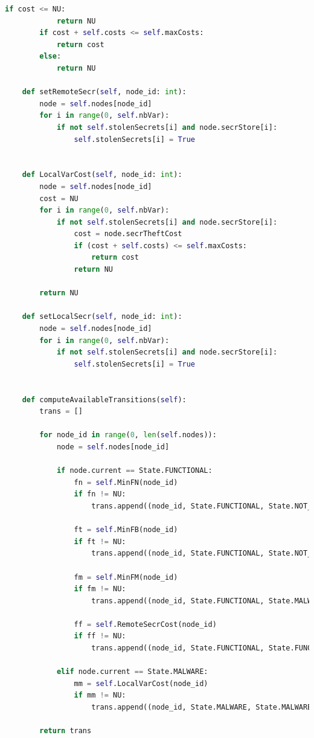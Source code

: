 \documentclass[a4paper]{article}
\begin{document}
\begin{appendices}
\begin{lstlisting}[language=python]
        if cost <= NU:
            return NU
        if cost + self.costs <= self.maxCosts:
            return cost
        else:
            return NU
        
    def setRemoteSecr(self, node_id: int):
        node = self.nodes[node_id]
        for i in range(0, self.nbVar):
            if not self.stolenSecrets[i] and node.secrStore[i]:
                self.stolenSecrets[i] = True


    def LocalVarCost(self, node_id: int):
        node = self.nodes[node_id]
        cost = NU
        for i in range(0, self.nbVar):
            if not self.stolenSecrets[i] and node.secrStore[i]:
                cost = node.secrTheftCost
                if (cost + self.costs) <= self.maxCosts:
                    return cost
                return NU

        return NU

    def setLocalSecr(self, node_id: int):
        node = self.nodes[node_id]
        for i in range(0, self.nbVar):
            if not self.stolenSecrets[i] and node.secrStore[i]:
                self.stolenSecrets[i] = True


    def computeAvailableTransitions(self):
        trans = []

        for node_id in range(0, len(self.nodes)):
            node = self.nodes[node_id]

            if node.current == State.FUNCTIONAL:
                fn = self.MinFN(node_id)
                if fn != NU:
                    trans.append((node_id, State.FUNCTIONAL, State.NOT_AVAILABLE, fn, None))

                ft = self.MinFB(node_id)
                if ft != NU:
                    trans.append((node_id, State.FUNCTIONAL, State.NOT_AVAILABLE, ft, None))

                fm = self.MinFM(node_id)
                if fm != NU:
                    trans.append((node_id, State.FUNCTIONAL, State.MALWARE, fm, None))

                ff = self.RemoteSecrCost(node_id)
                if ff != NU:
                    trans.append((node_id, State.FUNCTIONAL, State.FUNCTIONAL, ff, self.setRemoteSecr))

            elif node.current == State.MALWARE:
                mm = self.LocalVarCost(node_id)
                if mm != NU:
                    trans.append((node_id, State.MALWARE, State.MALWARE, mm, self.setLocalSecr))
            
        return trans



\end{lstlisting}
\end{appendices}
\end{document}
